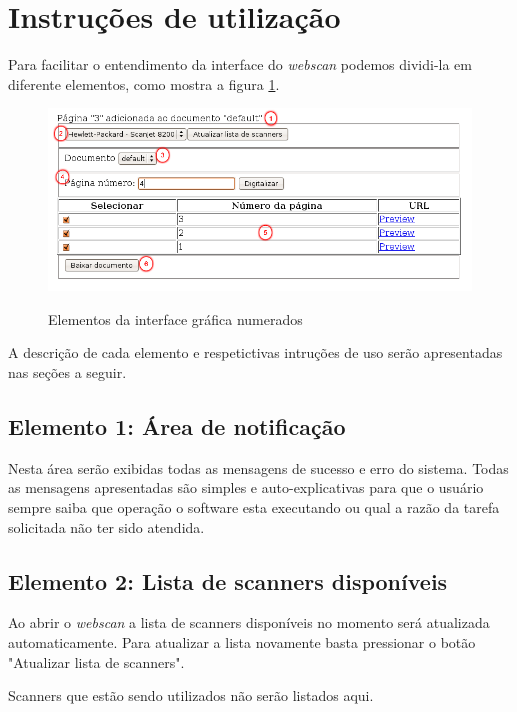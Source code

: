 \section{Instruções de utilização}
\label{sec:utilizacao}

Para facilitar o entendimento da interface do {\it webscan} podemos
dividi-la em diferente elementos, como mostra a figura \ref{fig:interface}.

\begin{figure}[ht]
\begin{center}
\scalebox{0.55} {
    \includegraphics{imagens/interface.png}}
\end{center}
  \caption{Elementos da interface gráfica numerados}
  \label{fig:interface}
\end{figure}

A descrição de cada elemento e respetictivas intruções de uso
serão apresentadas nas seções a seguir.


\subsection{Elemento 1: Área de notificação}
Nesta área serão exibidas todas as mensagens de sucesso e
erro do sistema. Todas as mensagens apresentadas são simples 
e auto-explicativas para que o usuário sempre saiba que 
operação o software esta executando ou qual a razão da tarefa 
solicitada não ter sido atendida.

\subsection{Elemento 2: Lista de scanners disponíveis}
Ao abrir o {\it webscan} a lista de scanners disponíveis no 
momento será atualizada automaticamente. Para atualizar a 
lista novamente basta pressionar o botão "Atualizar lista 
de scanners".

Scanners que estão sendo utilizados não serão listados aqui. 

